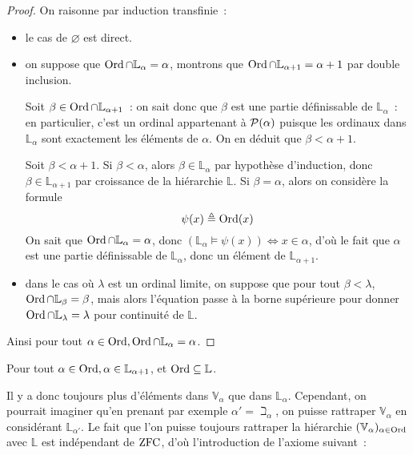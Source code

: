 \begin{proof}
  On raisonne par induction transfinie~:
  \begin{itemize}
  \item le cas de $\varnothing$ est direct.
  \item on suppose que $\operatorname{Ord} \cap \mathbb L_\alpha = \alpha$, montrons que
    $\operatorname{Ord}\cap \mathbb L_{\alpha + 1} = \alpha + 1$ par double inclusion.

    Soit $\beta \in\operatorname{Ord}\cap \mathbb L_{\alpha + 1}$~: on sait donc que
    $\beta$ est une partie définissable de $\mathbb L_\alpha$~: en particulier,
    c'est un ordinal appartenant à $\mathcal{P}(\alpha)$ puisque les ordinaux
    dans $\mathbb L_\alpha$ sont exactement les éléments de $\alpha$. On en
    déduit que $\beta < \alpha + 1$.

    Soit $\beta < \alpha + 1$. Si $\beta < \alpha$, alors
    $\beta \in \mathbb L_\alpha$ par hypothèse d'induction, donc
    $\beta \in \mathbb L_{\alpha + 1}$ par croissance de la hiérarchie
    $\mathbb L$. Si $\beta = \alpha$, alors on considère la formule
    \[\psi(x)\triangleq \operatorname{Ord}(x)\]
    On sait que $\operatorname{Ord}\cap \mathbb L_\alpha = \alpha$, donc
    $(\mathbb L_\alpha \models \psi(x)) \iff x \in \alpha$, d'où
    le fait que $\alpha$ est une partie définissable de $\mathbb L_\alpha$, donc
    un élément de $\mathbb L_{\alpha + 1}$.
  \item dans le cas où $\lambda$ est un ordinal limite, on suppose que pour tout
    $\beta < \lambda$, $\operatorname{Ord} \cap \mathbb L_\beta = \beta$, mais alors l'équation
    passe à la borne supérieure pour donner
    $\operatorname{Ord}\cap \mathbb L_\lambda = \lambda$ pour continuité de $\mathbb L$.
  \end{itemize}
  Ainsi pour tout $\alpha \in \operatorname{Ord}, \operatorname{Ord} \cap \mathbb L_\alpha = \alpha$.
\end{proof}

\begin{corollary}
  Pour tout $\alpha \in \operatorname{Ord}, \alpha \in \mathbb L_{\alpha + 1}$, et
  $\operatorname{Ord} \subseteq \mathbb L$.
\end{corollary}

Il y a donc toujours plus d'éléments dans $\mathbb V_\alpha$ que dans
$\mathbb L_\alpha$. Cependant, on pourrait imaginer qu'en prenant par exemple
$\alpha' = \beth_\alpha$, on puisse rattraper $\mathbb V_\alpha$ en considérant
$\mathbb L_{\alpha'}$. Le fait que l'on puisse toujours rattraper la hiérarchie
$(\mathbb V_{\alpha})_{\alpha\in\operatorname{Ord}}$ avec $\mathbb L$ est indépendant de $\operatorname{ZFC}$,
d'où l'introduction de l'axiome suivant~:

